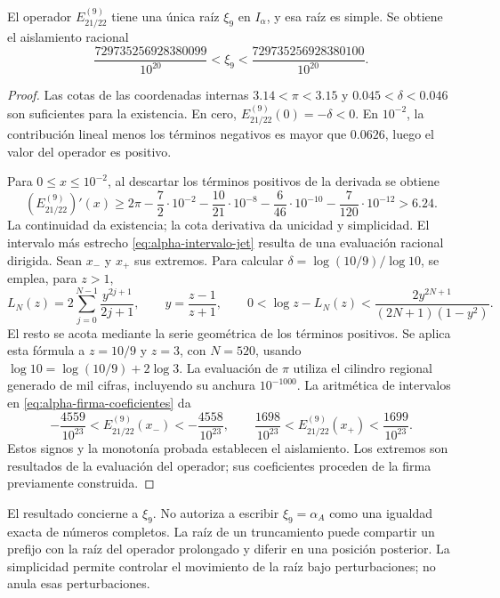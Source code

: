 \begin{proposition}
\label{prop:alpha-raiz-jet}
El operador \(E_{21/22}^{(9)}\) tiene una única raíz
\(\xi_9\) en \(I_\alpha\), y esa raíz es simple. Se obtiene el aislamiento racional
\begin{equation}
 \frac{729735256928380099}{10^{20}}
 <\xi_9<\frac{729735256928380100}{10^{20}}.
 \label{eq:alpha-intervalo-jet}
\end{equation}
\end{proposition}

\begin{proof}
Las cotas de las coordenadas internas
\(3.14<\pi<3.15\) y
\(0.045<\delta<0.046\) son suficientes para la existencia. En cero,
\(E_{21/22}^{(9)}(0)=-\delta<0\). En \(10^{-2}\), la contribución
lineal menos los términos negativos es mayor que \(0.0626\), luego el
valor del operador es positivo.

Para \(0\leq x\leq10^{-2}\), al descartar los términos positivos de
la derivada se obtiene
\[
 (E_{21/22}^{(9)})'(x)
 \geq2\pi-\frac72\cdot10^{-2}
 -\frac{10}{21}\cdot10^{-8}-\frac6{46}\cdot10^{-10}
 -\frac7{120}\cdot10^{-12}>6.24.
\]
La continuidad da existencia; la cota derivativa da unicidad y
simplicidad. El intervalo más estrecho
\eqref{eq:alpha-intervalo-jet} resulta de una evaluación racional dirigida.
Sean \(x_-\) y \(x_+\) sus extremos. Para calcular
\(\delta=\log(10/9)/\log 10\), se emplea, para \(z>1\),
\[
 L_N(z)=2\sum_{j=0}^{N-1}\frac{y^{2j+1}}{2j+1},\qquad
 y=\frac{z-1}{z+1},\qquad
 0<\log z-L_N(z)<\frac{2y^{2N+1}}{(2N+1)(1-y^2)}.
\]
El resto se acota mediante la serie geométrica de los términos positivos.
Se aplica esta fórmula a \(z=10/9\) y \(z=3\), con \(N=520\),
usando \(\log 10=\log(10/9)+2\log3\). La evaluación de
\(\pi\) utiliza el cilindro regional generado de mil cifras, incluyendo
su anchura \(10^{-1000}\). La aritmética de intervalos en
\eqref{eq:alpha-firma-coeficientes} da
\[
 -\frac{4559}{10^{23}}<E_{21/22}^{(9)}(x_-)< -\frac{4558}{10^{23}},
 \qquad
 \frac{1698}{10^{23}}<E_{21/22}^{(9)}(x_+)<\frac{1699}{10^{23}}.
\]
Estos signos y la monotonía probada establecen el aislamiento. Los extremos
son resultados de la evaluación del operador; sus coeficientes proceden de
la firma previamente construida.
\end{proof}

El resultado concierne a \(\xi_9\). No autoriza a escribir
\(\xi_9=\alpha_A\) como una igualdad exacta de números completos.
La raíz de un truncamiento puede compartir un prefijo con la raíz del
operador prolongado y diferir en una posición posterior. La simplicidad
permite controlar el movimiento de la raíz bajo perturbaciones; no
anula esas perturbaciones.

